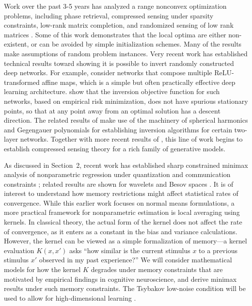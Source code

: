 Work over the past 3-5 years has analyzed a range nonconvex
optimization problems, including phase retrieval, compressed
sensing under sparsity constraints, low-rank matrix
completion, and randomized sensing of low rank matrices
\cite{phaselift_1,phaselift_2,phaselift_3,ZhaWanLiu15,WeiCaiCha16,ZheLaf15,phaselift_1,phaselift_2,phaselift_3,ZhaWanLiu15,WeiCaiCha16}.
Some of this work demonstrates that the local optima are either
non-existent, or can be avoided by simple initialization schemes. Many
of the results make assumptions of random problem instances.  Very
recent work has established technical results toward showing it is
possible to invert randomly constructed deep networks. For example,
\cite{HandV17} consider networks that compose multiple ReLU-transformed affine
maps, which is a simple but often practically effective deep learning
architecture.  
\cite{HandV17} show that the inversion objective function for such networks, based
on empirical risk minimization, does not have spurious stationary
points, so that at any point away from an optimal solution has a
descent direction. The related results of \cite{Mixon18} make use of
the machinery of spherical harmonics and Gegengauer polynomials for
establishing inversion algorithms for certain two-layer
networks. Together with more recent results of \cite{HandV18}, this
line of work begins to establish compressed sensing theory for a rich
family of generative models.


As discussed in Section~2, recent work has established 
sharp constrained minimax analysis of nonparametric
regression under quantization and communication
constraints \citep{Zhu:18,Zhu:18b}; related results are shown
for wavelets and Besov spaces \citep{szabo18}.
It is of interest to understand how memory restrictions might affect
statistical rates of convergence. While this earlier work focuses on
normal means formulations, a more practical framework for
nonparametric estimation is local averaging using kernels. In
classical theory, the actual form of the kernel does not affect the
rate of convergence, as it enters as a constant in the bias and
variance calculations. However, the kernel can be viewed as a
simple formalization of memory---a kernel evaluation $K(x,x')$ asks
``how similar is the current stimulus $x$ to a previous stimulus $x'$
observed in my past experience?'' We will consider mathematical models for
how the kernel $K$ degrades under memory constraints that
are motivated by empirical findings in cognitive neuroscience,
and derive minimax results under such memory constraints. The
Tsybakov low-noise condition will be used to allow for
high-dimensional learning \citep{mammen1999,tsybakov2004,audibert2007}.



